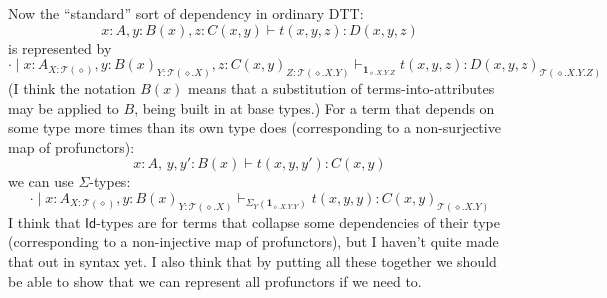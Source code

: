 \documentclass[10pt]{article}
\newcommand{\yields}{\vdash}
\newcommand{\cbar}{\mid}
\let\ec\diamond
\newcommand{\T}{\mathscr{T}}
\newcommand{\atX}{X}
\newcommand{\atY}{Y}
\newcommand{\atZ}{Z}
\newcommand{\unit}{\mathbf{1}}
\newcommand{\Id}{\mathsf{Id}}
\begin{document}
Now the ``standard'' sort of dependency in ordinary DTT:
\[ x:A, y:B(x), z:C(x,y) \yields t(x,y,z) : D(x,y,z) \]
is represented by
\[ \cdot \cbar x:A_{\atX:\T(\ec)}, y:B(x)_{\atY:\T(\ec.\atX)}, z:C(x,y)_{\atZ:\T(\ec.\atX.\atY)} \yields_{\unit_{\ec.\atX.\atY.\atZ}} t(x,y,z) : D(x,y,z)_{\T(\ec.\atX.\atY.\atZ)}
\]
(I think the notation $B(x)$ means that a substitution of terms-into-attributes may be applied to $B$, being built in at base types.)
For a term that depends on some type more times than its own type does (corresponding to a non-surjective map of profunctors):
\[ x:A,\, y,y':B(x) \yields t(x,y,y') : C(x,y) \]
we can use $\Sigma$-types:
\[ \cdot \cbar x:A_{\atX:\T(\ec)}, y:B(x)_{\atY:\T(\ec.\atX)} \yields_{\Sigma_{\atY}(\unit_{\ec.\atX.\atY.\atY})} t(x,y,y) : C(x,y)_{\T(\ec.\atX.\atY)}
\]
I think that $\Id$-types are for terms that collapse some dependencies of their type (corresponding to a non-injective map of profunctors), but I haven't quite made that out in syntax yet.
I also think that by putting all these together we should be able to show that we can represent all profunctors if we need to.
\end{document}
